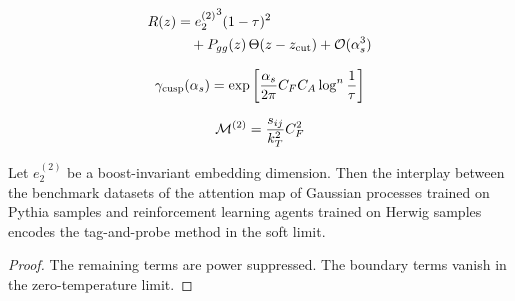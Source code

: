 \begin{align}
  R(z) &= {e_2^{(2)}}^{3} (1 - \tau)^{2} \nonumber \\
  &\quad + P_{gg}(z) \, \Theta(z - z_{\rm cut}) + \mathcal{O}(\alpha_s^3) \label{eq:1}
\end{align}

\begin{equation}
  \gamma_{\rm cusp}(\alpha_s) = \exp\left[\frac{\alpha_s}{2\pi} C_F C_A \log^{n} \frac{1}{\tau}\right]
  \label{eq:2}
\end{equation}

\begin{equation}
  \mathcal{M}^{(2)} = \frac{s_{ij}}{k_T^2} C_F^2
  \label{eq:3}
\end{equation}

\begin{lemma}\label{thm:3}
Let $e_2^{(2)}$ be a boost-invariant embedding dimension. Then the
interplay between the benchmark datasets of the attention map of
Gaussian processes trained on Pythia samples and reinforcement learning
agents trained on Herwig samples encodes the tag-and-probe method in the
soft limit.
\end{lemma}

\begin{proof}
The remaining terms are power suppressed. The boundary terms vanish in
the zero-temperature limit.
\end{proof}

